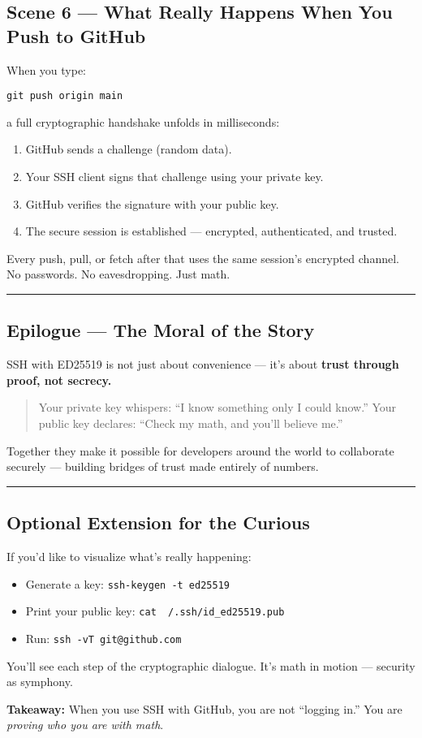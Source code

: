 \documentclass[12pt]{article}
\begin{document}
\subsection*{Scene 6 — What Really Happens When You Push to GitHub}

When you type:
\begin{verbatim}
git push origin main
\end{verbatim}

a full cryptographic handshake unfolds in milliseconds:

\begin{enumerate}
  \item GitHub sends a challenge (random data).
  \item Your SSH client signs that challenge using your private key.
  \item GitHub verifies the signature with your public key.
  \item The secure session is established — encrypted, authenticated, and trusted.
\end{enumerate}

Every push, pull, or fetch after that uses the same session’s encrypted channel.  
No passwords. No eavesdropping. Just math.

\bigskip
\hrule
\vspace{0.5em}

\subsection*{Epilogue — The Moral of the Story}

SSH with ED25519 is not just about convenience —  
it’s about \textbf{trust through proof, not secrecy.}

\begin{quote}
Your private key whispers: “I know something only I could know.”  
Your public key declares: “Check my math, and you’ll believe me.”
\end{quote}

Together they make it possible for developers around the world  
to collaborate securely — building bridges of trust made entirely of numbers.

\bigskip
\hrule
\vspace{0.5em}

\subsection*{Optional Extension for the Curious}

If you’d like to visualize what’s really happening:
\begin{itemize}
  \item Generate a key: \texttt{ssh-keygen -t ed25519}
  \item Print your public key: \texttt{cat ~/.ssh/id\_ed25519.pub}
  \item Run: \texttt{ssh -vT git@github.com}
\end{itemize}

You’ll see each step of the cryptographic dialogue.  
It’s math in motion — security as symphony.

\bigskip
\textbf{Takeaway:}  
When you use SSH with GitHub, you are not “logging in.”  
You are \emph{proving who you are with math}.
\end{document}
